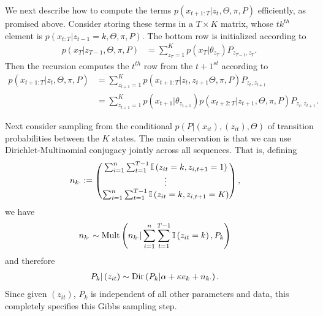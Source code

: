We next describe how to compute the terms $p\left(x_{t + 1:T} \vert z_t, \Theta,
\pi, P\right)$ efficiently, as promised above. Consider storing these terms in a
$T \times K$ matrix, whose $tk^{th}$ element is $p\left(x_{t:T} \vert z_{t - 1} =
k, \Theta, \pi, P\right)$. The bottom row is initialized according to
\begin{align*}
 p\left(x_T \vert z_{T - 1}, \Theta, \pi, P\right)  &= \sum_{z_{T} = 1}^{K} p\left(x_{T} \vert \theta_{z_{T}}\right) P_{z_{T - 1}, z_{T}}.
\end{align*}
Then the recursion computes the $t^{th}$ row from the $t + 1^{st}$ according to
\begin{align*}
  p\left(x_{t + 1:T} \vert z_t, \Theta, \pi, P\right) &= \sum_{z_{t + 1} = 1}^{K} p\left(x_{t + 1 : T} \vert z_{t}, z_{t + 1} \Theta, \pi, P\right) P_{z_{t}, z_{t + 1}} \\
  &= \sum_{z_{t + 1} = 1}^{K} p\left(x_{t + 1} \vert \theta_{z_{t + 1}}\right) p\left(x_{t + 2 : T} \vert z_{t + 1}, \Theta, \pi, P\right) P_{z_{t}, z_{t + 1}}.
\end{align*}

Next consider sampling from the conditional $p\left(P \vert \left(x_{it}\right),
\left(z_{it}\right), \Theta\right)$ of transition probabilities between the $K$
states. The main observation is that we can use Dirichlet-Multinomial conjugacy
jointly across all sequences. That is, defining
\begin{align*}
 n_{k \cdot} &:= \begin{pmatrix} \sum_{i = 1}^{n} \sum_{t = 1}^{T - 1} \mathbb{I}\left({z_{it} = k, z_{i,t + 1} = 1}\right) \\ \vdots \\ \sum_{i = 1}^{n} \sum_{t = 1}^{T - 1} \mathbb{I}\left({z_{it} = k, z_{i,t + 1} = K}\right) \end{pmatrix},
\end{align*}
we have
\begin{align*}
n_{k\cdot} &\sim \textnormal{Mult}\left(n_{k\cdot} \vert \sum_{i = 1}^{n} \sum_{t = 1}^{T - 1} \mathbb{I}\left({z_{it} = k}\right), P_{k}\right)
\end{align*}
and therefore
\begin{align}
  \label{eq:sticky_hmm_p_update}
  P_{k} \vert \left(z_{it}\right) &\sim \textnormal{Dir}\left(P_{k} \vert \alpha + \kappa e_{k} + n_{k\cdot}\right).
\end{align}
Since given $\left(z_{it}\right)$, $P_{k}$ is independent of all other
parameters and data, this completely specifies this Gibbs sampling step.

